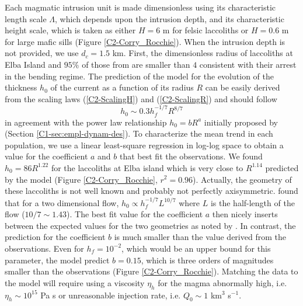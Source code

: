 Each  magmatic   intrusion  unit  is  made   dimensionless  using  its
characteristic  length   scale  $\Lambda$,  which  depends   upon  the
intrusion depth, and  its characteristic height scale,  which is taken
as either $H=6$  m for felsic laccoliths or $H=0.6$  m for large mafic
sills (Figure \ref{C2-Corry_Rocchie}). When the intrusion depth is not
provided, we  use $d_c=1.5$  km.  First,  the dimensionless  radius of
laccoliths at  Elba Island and  $95\%$ of those  from \citet{E:2015tl}
are  smaller than  $4$ consistent  with  their arrest  in the  bending
regime.   The  prediction  of  the  model for  the  evolution  of  the
thickness $h_0$ of the current as a  function of its radius $R$ can be
easily  derived   from  the   scaling  laws   (\ref{C2-ScalingH})  and
(\ref{C2-ScalingR}) and should follow
\begin{equation}
  h_0 \sim 0.3h_f^{-1/7} R^{8/7}\label{C2-Hr}
\end{equation}
in agreement  with the power  law relationship $h_0 =  bR^a$ initially
proposed         by          \citet{McCaffrey:1997ea}         (Section
\ref{C1-sec:empl-dynam-des}).  To characterize the  mean trend in each
population, we use  a linear least-square regression  in log-log space
to obtain a  value for the coefficient  $a$ and $b$ that  best fit the
observations.  We found $h_0 = 86 R^{1.22}$ for the laccoliths at Elba
island  which is  very  close  to $R^{1.14}$  predicted  by the  model
(Figure \ref{C2-Corry_Rocchie},  $r^2=0.96$).  Actually,  the geometry
of  these laccoliths  is not  well  known and  probably not  perfectly
axisymmetric.   \citet{Anonymous:QWXp_4JV}   found  that  for   a  two
dimensional  flow, $h_0\propto  h_f^{-1/7}L^{10/7}$ where  $L$ is  the
half-length of the flow ($10/7\sim 1.43$).  The best fit value for the
coefficient $a$  then nicely inserts  between the expected  values for
the two  geometries as noted by  \citet{Michaut:2011kg}.  In contrast,
the prediction for the coefficient $b$  is much smaller than the value
derived from the observations.  Even for $h_f=10^{-2}$, which would be
an upper bound  for this parameter, the model  predict $b=0.15$, which
is three  orders of magnitudes  smaller than the  observations (Figure
\ref{C2-Corry_Rocchie}).  Matching the data  to the model will require
using  a  viscosity  $\eta_h$  for the  magma  abnormally  high,  i.e.
$\eta_h   \sim  10^{15}$   Pa  s   or  unreasonable   injection  rate,
i.e. $Q_0\sim 1$ km$^3$ s$^{-1}$.

